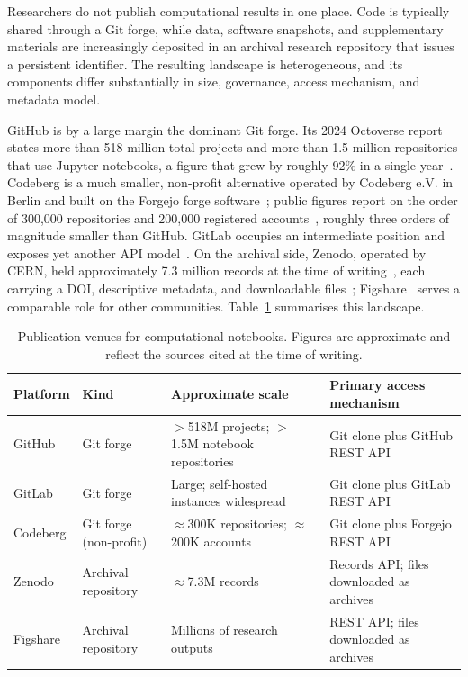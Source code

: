 Researchers do not publish computational results in one place. Code is typically shared through a Git forge, while data, software snapshots, and supplementary materials are increasingly deposited in an archival research repository that issues a persistent identifier. The resulting landscape is heterogeneous, and its components differ substantially in size, governance, access mechanism, and metadata model.

GitHub is by a large margin the dominant Git forge. Its 2024 Octoverse report states more than 518 million total projects and more than 1.5 million repositories that use Jupyter notebooks, a figure that grew by roughly 92\% in a single year~\cite{octoverse2024}. Codeberg is a much smaller, non-profit alternative operated by Codeberg e.V. in Berlin and built on the Forgejo forge software~\cite{codebergdocs,forgejoapi}; public figures report on the order of 300{,}000 repositories and 200{,}000 registered accounts~\cite{codebergstats}, roughly three orders of magnitude smaller than GitHub. GitLab occupies an intermediate position and exposes yet another API model~\cite{gitlabdocs}. On the archival side, Zenodo, operated by CERN, held approximately 7.3 million records at the time of writing~\cite{zenodostats}, each carrying a DOI, descriptive metadata, and downloadable files~\cite{zenodoapi}; Figshare~\cite{figshare} serves a comparable role for other communities. Table~\ref{tab:platform-landscape} summarises this landscape.

\begin{table}[ht]
\centering
\caption{Publication venues for computational notebooks. Figures are approximate and reflect the sources cited at the time of writing.}
\label{tab:platform-landscape}
\small
\begin{tabularx}{\textwidth}{@{}p{1.9cm}p{2.5cm}p{2.9cm}X@{}}
\toprule
Platform & Kind & Approximate scale & Primary access mechanism\tabularnewline
\midrule
GitHub & Git forge & $>$518M projects; $>$1.5M notebook repositories~\cite{octoverse2024} & Git clone plus GitHub REST API~\cite{githubapi}\tabularnewline
GitLab & Git forge & Large; self-hosted instances widespread & Git clone plus GitLab REST API~\cite{gitlabdocs}\tabularnewline
Codeberg & Git forge (non-profit) & $\approx$300K repositories; $\approx$200K accounts~\cite{codebergstats} & Git clone plus Forgejo REST API~\cite{forgejoapi}\tabularnewline
Zenodo & Archival repository & $\approx$7.3M records~\cite{zenodostats} & Records API; files downloaded as archives~\cite{zenodoapi}\tabularnewline
Figshare & Archival repository & Millions of research outputs~\cite{figshare} & REST API; files downloaded as archives\tabularnewline
\bottomrule
\end{tabularx}
\end{table}

